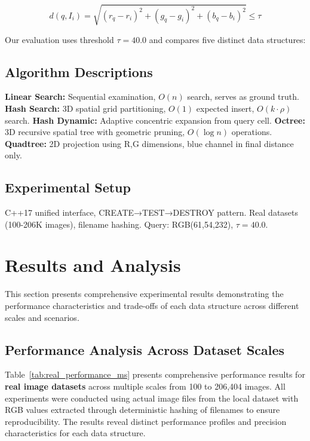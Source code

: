 \documentclass{sbc2023}
\begin{document}
\begin{equation}
d(q, I_i) = \sqrt{(r_q - r_i)^2 + (g_q - g_i)^2 + (b_q - b_i)^2} \leq \tau
\label{eq:euclidean_distance}
\end{equation}

Our evaluation uses threshold $\tau = 40.0$ and compares five distinct data structures:

\subsection{Algorithm Descriptions}

\textbf{Linear Search:} Sequential examination, $O(n)$ search, serves as ground truth. \textbf{Hash Search:} 3D spatial grid partitioning, $O(1)$ expected insert, $O(k \cdot \rho)$ search. \textbf{Hash Dynamic:} Adaptive concentric expansion from query cell. \textbf{Octree:} 3D recursive spatial tree with geometric pruning, $O(\log n)$ operations. \textbf{Quadtree:} 2D projection using R,G dimensions, blue channel in final distance only.

\subsection{Experimental Setup}

C++17 unified interface, CREATE→TEST→DESTROY pattern. Real datasets (100-206K images), filename hashing. Query: RGB(61,54,232), $\tau = 40.0$.


\section{Results and Analysis}
\label{sec:results}

This section presents comprehensive experimental results demonstrating the performance characteristics and trade-offs of each data structure across different scales and scenarios.

\subsection{Performance Analysis Across Dataset Scales}

Table~\ref{tab:real_performance_ms} presents comprehensive performance results for \textbf{real image datasets} across multiple scales from 100 to 206,404 images. All experiments were conducted using actual image files from the local dataset with RGB values extracted through deterministic hashing of filenames to ensure reproducibility. The results reveal distinct performance profiles and precision characteristics for each data structure.
\end{document}

